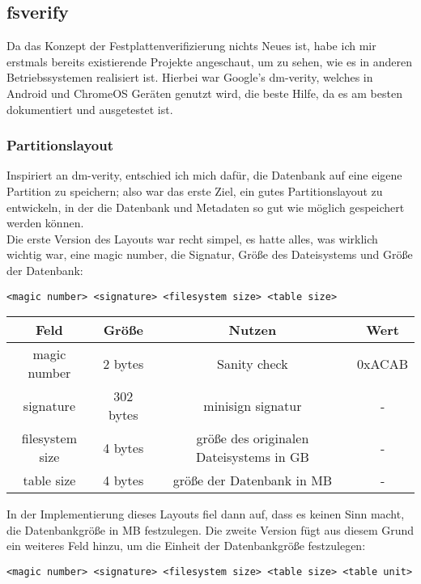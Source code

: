 \subsection{fsverify}
Da das Konzept der Festplattenverifizierung nichts Neues ist, habe ich mir erstmals bereits existierende Projekte angeschaut, um zu sehen, wie es in anderen Betriebssystemen realisiert ist.
Hierbei war Google's dm-verity, welches in Android und ChromeOS Geräten genutzt wird, die beste Hilfe, da es am besten dokumentiert und ausgetestet ist.

\subsubsection{Partitionslayout}
Inspiriert an dm-verity, entschied ich mich dafür, die Datenbank auf eine eigene Partition zu speichern; also war das erste Ziel, ein gutes Partitionslayout zu entwickeln, in der die Datenbank und Metadaten so gut wie möglich gespeichert werden können.\\
Die erste Version des Layouts war recht simpel, es hatte alles, was wirklich wichtig war, eine magic number, die Signatur, Größe des Dateisystems und Größe der Datenbank:
\begin{verbatim}
<magic number> <signature> <filesystem size> <table size>
\end{verbatim}

\begin{center}
  \begin{tabular}{|c | c | c | c|}
    \hline
    Feld & Größe & Nutzen & Wert \\ [0.5ex]
    \hline
    magic number & 2 bytes & Sanity check & 0xACAB \\
    \hline
    signature & 302 bytes & minisign signatur & - \\
    \hline
    filesystem size & 4 bytes & größe des originalen Dateisystems in GB & - \\
    \hline
    table size & 4 bytes & größe der Datenbank in MB & - \\
    \hline
  \end{tabular}
\end{center}
In der Implementierung dieses Layouts fiel dann auf, dass es keinen Sinn macht, die Datenbankgröße in MB festzulegen.
Die zweite Version fügt aus diesem Grund ein weiteres Feld hinzu, um die Einheit der Datenbankgröße festzulegen:
\begin{verbatim}
<magic number> <signature> <filesystem size> <table size> <table unit>
\end{verbatim}

